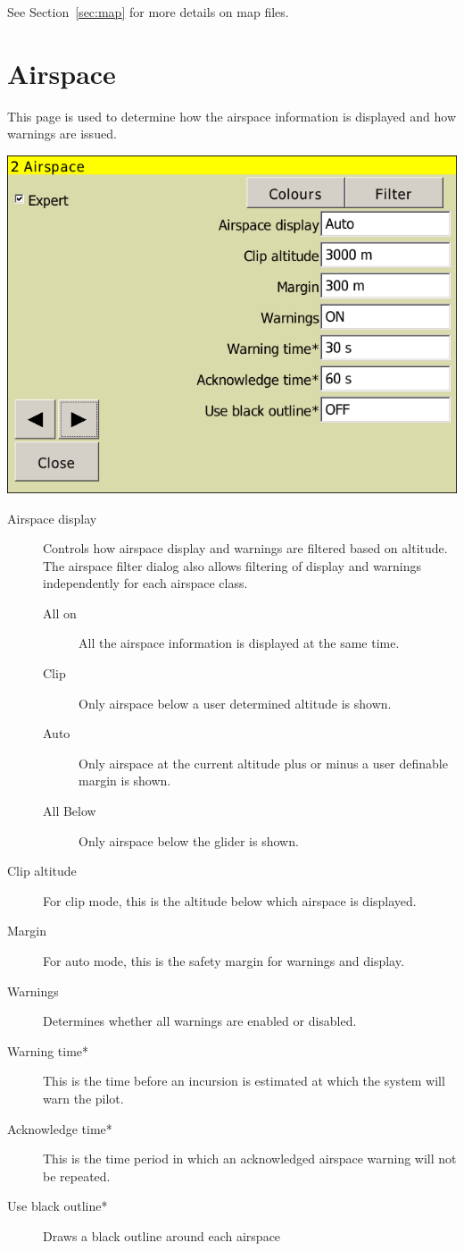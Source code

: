 See Section~\ref{sec:map} for more details on map files.


\clearpage
\section{Airspace}

This page is used to determine how the airspace information is
displayed and how warnings are issued.

\begin{center}
\includegraphics[angle=0,width=0.8\linewidth,keepaspectratio='true']{figures/config-airspace.png}
\end{center}

\begin{description}
\item[Airspace display] Controls how airspace display and warnings are filtered based on altitude.  The airspace filter dialog also allows filtering
 of display and warnings independently for each airspace class.
\begin{description}
\item[All on] All the airspace information is displayed at the same time.
\item[Clip] Only airspace below a user determined altitude is shown.
\item[Auto] Only airspace at the current altitude plus or minus a user definable margin is shown.
\item[All Below]  Only airspace below the glider is shown.
\end{description}
\item[Clip altitude] For clip mode, this is the altitude below which airspace is displayed.
\item[Margin] For auto mode, this is the safety margin for warnings and display.
\item[Warnings] Determines whether all warnings are enabled or disabled.
\item[Warning time*]  This is the time before an incursion is estimated at
  which the system will warn the pilot.
\item[Acknowledge time*]  This is the time period in which an acknowledged airspace warning will not be repeated.
\item[Use black outline*] Draws a black outline around each airspace
\end{description}

